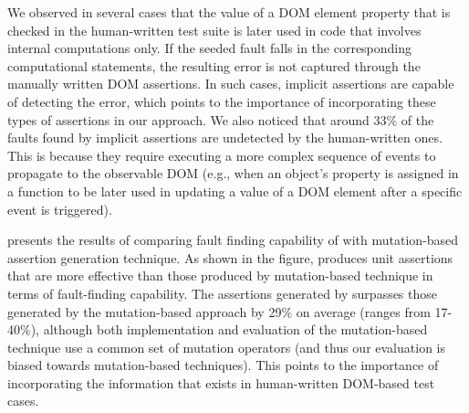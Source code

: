 We observed in several cases that the value of a DOM element property that is checked in the human-written test suite is later used in \javascript code that involves internal computations only. If the seeded fault falls in the corresponding computational statements, the resulting error is not captured through the manually written DOM assertions. In such cases, implicit assertions are capable of detecting the error, which points to the importance of incorporating these types of assertions in our approach. We also noticed that around 33\% of the faults found by implicit assertions are undetected by the human-written ones. This is because they require executing a more complex sequence of events to propagate to the observable DOM (e.g., when an object's property is assigned in a function to be later used in updating a value of a DOM element after a specific event is triggered). 

 presents the results of comparing fault finding capability of \tool with mutation-based assertion generation technique. As shown in the figure, \tool produces unit assertions that are more effective than those produced by mutation-based technique in terms of fault-finding capability. The assertions generated by \tool surpasses those generated by the mutation-based approach by 29\% on average (ranges from 17-40\%), although both implementation and evaluation of the mutation-based technique use a common set of mutation operators (and thus our evaluation is biased towards mutation-based techniques).
This points to the importance of incorporating the information that exists in human-written DOM-based test cases.       



